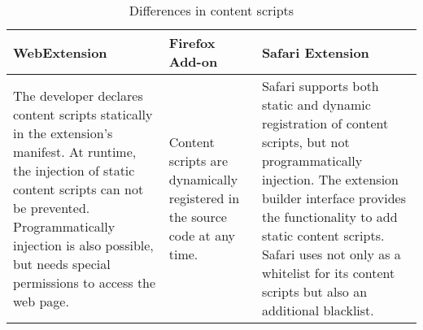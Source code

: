 	\begin{table}[h]
		\begin{tabular}{|p{}|p{}|p{}|}\hline
			\textbf{WebExtension} & \textbf{Firefox Add-on} & \textbf{Safari Extension} \\ \hline
			The developer declares content scripts statically in the extension's manifest. At runtime, the injection of static content scripts can not be prevented. Programmatically injection is also possible, but needs special permissions to access the web page. & 
			Content scripts are dynamically registered in the source code at any time. & 
			Safari supports both static and dynamic registration of content scripts, but not programmatically injection. The extension builder interface provides the functionality to add static content scripts. Safari uses not only as a whitelist for its content scripts but also an additional blacklist. \\ \hline 
		\end{tabular}
		\caption{Differences in content scripts}
	\end{table}


